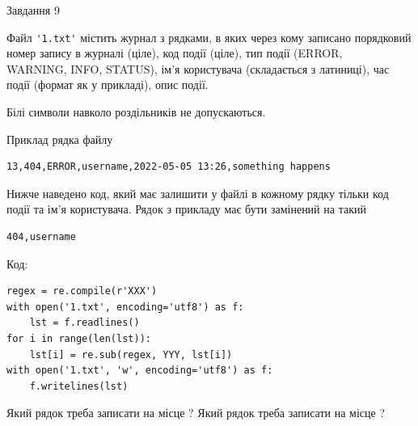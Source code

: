 \documentclass[12pt, ukrainian]{article}
\def\code#1{\Verb!#1!}
\begin{document}
{\begin{minipage}[t]{8.0cm}
\end{minipage}

               
{\begin{center}Завдання {9}\end{center}}
\vspace{-4mm}
Файл \code{'1.txt'} містить журнал з рядками, в яких через кому записано поряд\-ко\-вий номер запису в журналі (ціле), код події (ціле), тип події (ERROR, \\WARNING, INFO, STATUS), ім'я користувача (складається з латиниці), час події (фор\-мат як у прикладі), опис події.

Білі символи навколо роздільників не допускаються.

Приклад рядка файлу



\begin{verbatim}
13,404,ERROR,username,2022-05-05 13:26,something happens
\end{verbatim}


Нижче наведено код, який має залишити у файлі в кожному рядку тільки код події та ім'я користувача. Рядок з прикладу має бути замінений на такий



\begin{verbatim}
404,username
\end{verbatim}




Код:



\begin{verbatim}
regex = re.compile(r'XXX')
with open('1.txt', encoding='utf8') as f:
    lst = f.readlines()
for i in range(len(lst)):
    lst[i] = re.sub(regex, YYY, lst[i])
with open('1.txt', 'w', encoding='utf8') as f:
    f.writelines(lst)
\end{verbatim}





Який рядок треба записати на місце  ?
Який рядок треба записати на місце  ?\par

}
\newpage
\end{document}
